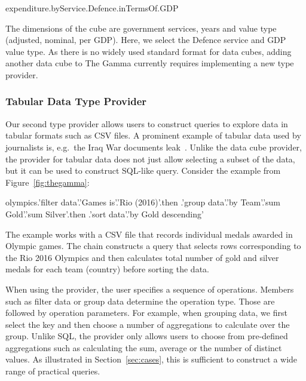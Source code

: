 \documentclass[manuscript,review,anonymous]{acmart}
\newcommand{\ikvd}[1]{{\fontfamily{zi4}\selectfont\small #1}}
\begin{document}
\begin{thegamma}
expenditure.byService.Defence.inTermsOf.GDP
\end{thegamma}

\noindent
The dimensions of the cube are government services, years and value type (adjusted, nominal,
per GDP). Here, we select the \ikvd{Defence} service and \ikvd{GDP} value type.
As there is no widely used standard format for data cubes, adding another data cube to The Gamma
currently requires implementing a new type provider.

\subsubsection*{Tabular Data Type Provider}

Our second type provider allows users to construct queries to explore data in tabular formats
such as CSV files. A prominent example of tabular data used by journalists is, e.g.~the
Iraq War documents leak~\cite{iraq}. Unlike the data cube provider, the provider for tabular data does not just
allow selecting a subset of the data, but it can be used to construct SQL-like query. Consider
the example from Figure~\ref{fig:thegamma}:

\begin{thegamma}
olympics.'filter data'.'Games is'.'Rio (2016)'.then
  .'group data'.'by Team'.'sum Gold'.'sum Silver'.then
  .'sort data'.'by Gold descending'
\end{thegamma}

\noindent
The example works with a CSV file that records individual medals awarded in Olympic games.
The chain constructs a query that selects rows corresponding to the Rio 2016 Olympics and then
calculates total number of gold and silver medals for each team (country) before sorting the data.

When using the provider, the user specifies a sequence of operations. Members such as
\ikvd{\textquotesingle filter data\textquotesingle} or \ikvd{\textquotesingle group data\textquotesingle}
determine the operation type. Those are followed by operation parameters. For example, when grouping
data, we first select the key and then choose a number of aggregations to calculate over the group.
Unlike SQL, the provider only allows users to choose from pre-defined aggregations such as
calculating the sum, average or the number of distinct values. As illustrated in
Section~\ref{sec:cases}, this is sufficient to construct a wide range of practical queries.
\end{document}
